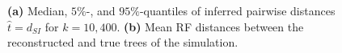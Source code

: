 \documentclass[9pt,english,utf8]{article}
\begin{document}
\begin{figure}[h]
    

    \caption{\textbf{(a)} Median, $5\%$-, and $95\%$-quantiles of inferred
    pairwise distances $\hat t = d_{SI}$ for $k=10, 400$. \textbf{(b)} Mean RF
    distances between the reconstructed and true trees of the simulation. }
\label{fig:results}
\end{figure}
\end{document}
